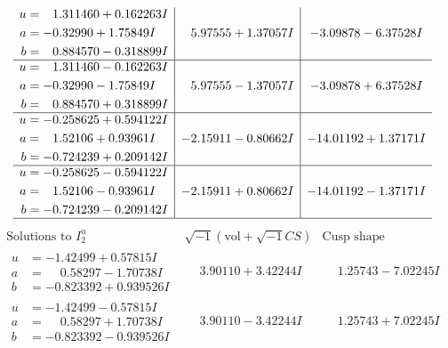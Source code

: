 \documentclass[1p]{elsarticle_modified}
\theoremstyle{definition}
\newcommand{\I}{\sqrt{-1}}
\begin{document}
$$\begin{array}{c|c|c}
\begin{aligned}
u &= \phantom{-}1.311460 + 0.162263 I \\
a &= -0.32990 + 1.75849 I \\
b &= \phantom{-}0.884570 - 0.318899 I\end{aligned}
 & \phantom{-}5.97555 + 1.37057 I & -3.09878 - 6.37528 I \\ \hline\begin{aligned}
u &= \phantom{-}1.311460 - 0.162263 I \\
a &= -0.32990 - 1.75849 I \\
b &= \phantom{-}0.884570 + 0.318899 I\end{aligned}
 & \phantom{-}5.97555 - 1.37057 I & -3.09878 + 6.37528 I \\ \hline\begin{aligned}
u &= -0.258625 + 0.594122 I \\
a &= \phantom{-}1.52106 + 0.93961 I \\
b &= -0.724239 + 0.209142 I\end{aligned}
 & -2.15911 - 0.80662 I & -14.01192 + 1.37171 I \\ \hline\begin{aligned}
u &= -0.258625 - 0.594122 I \\
a &= \phantom{-}1.52106 - 0.93961 I \\
b &= -0.724239 - 0.209142 I\end{aligned}
 & -2.15911 + 0.80662 I & -14.01192 - 1.37171 I\\
 \hline 
 \end{array}$$\newpage$$\begin{array}{c|c|c}  
\text{Solutions to }I^u_{2}& \I (\text{vol} + \sqrt{-1}CS) & \text{Cusp shape}\\
 \hline 
\begin{aligned}
u &= -1.42499 + 0.57815 I \\
a &= \phantom{-}0.58297 - 1.70738 I \\
b &= -0.823392 + 0.939526 I\end{aligned}
 & \phantom{-}3.90110 + 3.42244 I & \phantom{-}1.25743 - 7.02245 I \\ \hline\begin{aligned}
u &= -1.42499 - 0.57815 I \\
a &= \phantom{-}0.58297 + 1.70738 I \\
b &= -0.823392 - 0.939526 I\end{aligned}
 & \phantom{-}3.90110 - 3.42244 I & \phantom{-}1.25743 + 7.02245 I \\ \hline\begin{aligned}

\end{aligned}
\end{array}$$
\end{document}
